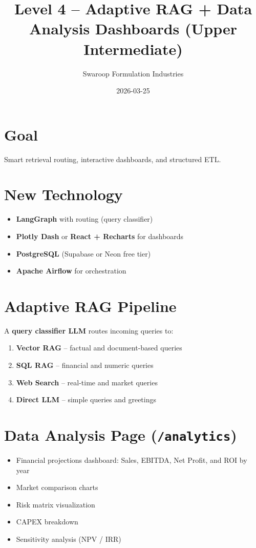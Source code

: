 \documentclass{article}
\title{Level 4 -- Adaptive RAG + Data Analysis Dashboards (Upper Intermediate)}
\author{Swaroop Formulation Industries}
\date{2026-03-25}
\begin{document}
\maketitle

\section{Goal}

Smart retrieval routing, interactive dashboards, and structured ETL.

\section{New Technology}

\begin{itemize}[leftmargin=*]
  \item \textbf{LangGraph} with routing (query classifier)
  \item \textbf{Plotly Dash} or \textbf{React + Recharts} for dashboards
  \item \textbf{PostgreSQL} (Supabase or Neon free tier)
  \item \textbf{Apache Airflow} for orchestration
\end{itemize}

\section{Adaptive RAG Pipeline}

A \textbf{query classifier LLM} routes incoming queries to:

\begin{enumerate}[leftmargin=*]
  \item \textbf{Vector RAG} -- factual and document-based queries
  \item \textbf{SQL RAG} -- financial and numeric queries
  \item \textbf{Web Search} -- real-time and market queries
  \item \textbf{Direct LLM} -- simple queries and greetings
\end{enumerate}

\section{Data Analysis Page (\texttt{/analytics})}

\begin{itemize}[leftmargin=*]
  \item Financial projections dashboard: Sales, EBITDA, Net Profit, and ROI by year
  \item Market comparison charts
  \item Risk matrix visualization
  \item CAPEX breakdown
  \item Sensitivity analysis (NPV / IRR)
\end{itemize}
\end{document}
